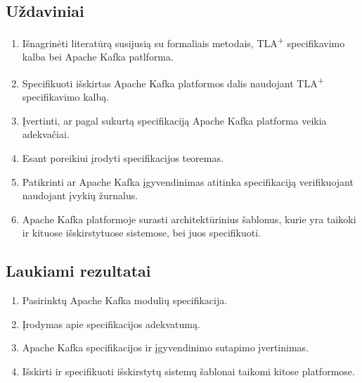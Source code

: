\documentclass{VUMIFPSmagistrinis}
\begin{document}
	\subsection{Uždaviniai}
		\begin{enumerate}
			\item{Išnagrinėti literatūrą susijusią su formaliais metodais, TLA\textsuperscript{+} specifikavimo kalba bei Apache Kafka patlforma.}
			\item{Specifikuoti išskirtas Apache Kafka platformos dalis naudojant TLA\textsuperscript{+} specifikavimo kalbą.}
			\item{Įvertinti, ar pagal sukurtą specifikaciją Apache Kafka platforma veikia adekvačiai.}
			\item{Esant poreikiui įrodyti specifikacijos teoremas.}
			\item{Patikrinti ar Apache Kafka įgyvendinimas atitinka specifikaciją verifikuojant naudojant įvykių žurnalus.}
			\item{Apache Kafka platformoje surasti architektūrinius šablonus, kurie yra taikoki ir kituose išskirstytuose sistemose, bei juos specifikuoti.}
		\end{enumerate}
	
	\subsection{Laukiami rezultatai}
		\begin{enumerate}
			\item{Pasirinktų Apache Kafka modulių specifikacija.}
			\item{Įrodymas apie specifikacijos adekvatumą.}
			\item{Apache Kafka specifikacijos ir įgyvendinimo sutapimo įvertinimas.}
			\item{Išskirti ir specifikuoti išskirstytų sistemų šablonai taikomi kitose platformose.}
		\end{enumerate}
	
	\printbibliography[heading=bibintoc] 
\end{document}
